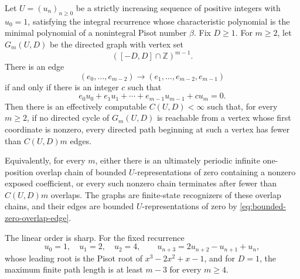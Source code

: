 \begin{theorem}
\label{thm:bounded-zero-linear-transient}
Let $U=(u_n)_{n\ge0}$ be a strictly increasing sequence of positive integers
with $u_0=1$, satisfying the integral recurrence whose characteristic
polynomial is the minimal polynomial of a nonintegral Pisot number $\beta$.
Fix $D\ge1$.  For $m\ge2$, let $G_m(U,D)$ be the directed graph with vertex
set
\[
([-D,D]\cap\mathbb Z)^{m-1}.
\]
There is an edge
\[
(e_0,\ldots,e_{m-2})\longrightarrow
(e_1,\ldots,e_{m-2},e_{m-1})
\]
if and only if there is an integer $c$ such that
\begin{equation}
e_0u_0+e_1u_1+\cdots+e_{m-1}u_{m-1}+cu_m=0.
\label{eq:bounded-zero-overlap-edge}
\end{equation}
Then there is an effectively computable $C(U,D)<\infty$ such that, for every
$m\ge2$, if no directed cycle of $G_m(U,D)$ is reachable from a vertex whose
first coordinate is nonzero, every directed path beginning at such a vertex
has fewer than $C(U,D)m$ edges.

Equivalently, for every $m$, either there is an ultimately periodic infinite
one-position overlap chain of bounded $U$-representations of zero containing
a nonzero exposed coefficient, or every such nonzero chain terminates after
fewer than $C(U,D)m$ overlaps.  The graphs are finite-state recognizers of
these overlap chains, and their edges are bounded $U$-representations of
zero by \eqref{eq:bounded-zero-overlap-edge}.

The linear order is sharp.  For the fixed recurrence
\[
u_0=1,\quad u_1=2,\quad u_2=4,\qquad
u_{n+3}=2u_{n+2}-u_{n+1}+u_n,
\]
whose leading root is the Pisot root of $x^3-2x^2+x-1$, and for $D=1$, the
maximum finite path length is at least $m-3$ for every $m\ge4$.
\end{theorem}

